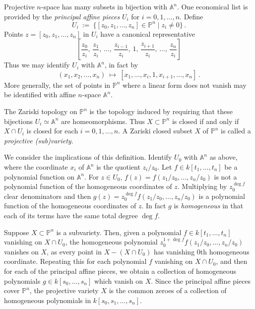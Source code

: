 \documentclass[12pt]{amsart}
\begin{document}
Projective $n$-space has many subsets in bijection with ${\mathbb A}^n$.
One economical list is provided by the {\sl principal affine pieces}
$U_i$ for $i=0,1,\ldots,n$.
Define
$$
  U_i\ :=\ \{[z_0,z_1,\ldots,z_n]\in{\mathbb P}^n\mid z_i\neq 0\}\,.
$$
Points $z=[z_0,z_1,\ldots,z_n]$ in $U_i$ have a canonical representative
$$
  \left[\frac{z_0}{z_i},\,\frac{z_1}{z_i},\,\ldots,\,
   \frac{z_{i-1}}{z_i},\,1,\,\frac{z_{i+1}}{z_i}
   ,\,\ldots,\,\frac{z_n}{z_i}\right]
$$
Thus we may identify $U_i$ with ${\mathbb A}^n$, in fact by
$$
  (x_1,x_2,\ldots,x_n)\ \longmapsto\ 
   [x_1,\ldots,x_i,1,x_{i+1},\ldots,x_n]\,.
$$
More generally, the set of points in ${\mathbb P}^n$ where a linear
form  does not vanish may be identified with affine $n$-space 
${\mathbb A}^n$.
\smallskip

The Zariski topology on ${\mathbb P}^n$ is the topology induced by requiring
that these bijections $U_i\simeq{\mathbb A}^n$ are homeomorphisms.
Thus $X\subset{\mathbb P}^n$ is closed if and only if $X\cap U_i$ is
closed for each $i=0,1,\ldots,n$.
A Zariski closed subset $X$ of ${\mathbb P}^n$ is called a 
{\sl projective (sub)variety}.
\smallskip

We consider the implications of this definition.
Identify $U_0$ with ${\mathbb A}^n$ as above, where the coordinate $x_i$ of
${\mathbb A}^n$ is the quotient $z_i/z_0$.
Let $f\in k[t_1,\ldots,t_n]$ be a polynomial function on ${\mathbb A}^n$.
For $z\in U_0$, $f(z)=f(z_1/z_0,\ldots,z_n/z_0)$ is not a polynomial
function of the homogeneous coordinates of $z$.
Multiplying by $z_0^{\deg f}$ clear denominators and 
then $g(z)=z_0^{\deg f}f(z_1/z_0,\ldots,z_n/z_0)$ is a polynomial
function of the homogeneous coordinates of $z$.
In fact $g$ is {\sl homogeneous} in that each of its terms have the same
total degree $\deg f$.

Suppose $X\subset {\mathbb P}^n$ is a subvariety.
Then, given a polynomial $f\in k[t_1,\ldots,t_n]$ vanishing on $X\cap U_0$,
the homogeneous polynomial $z_0^{1+\deg f}f(z_1/z_0,\ldots,z_n/z_0)$ 
vanishes on $X$, as every point in $X-(X\cap U_0)$ has vanishing 0th
homogeneous coordinate.
Repeating this for each polynomial $f$ vanishing on $X\cap U_0$, and then
for each of the principal affine pieces, we obtain a collection of
homogeneous polynomials $g\in k[s_0,\ldots,s_n]$ which vanish on $X$.
Since the principal affine pieces cover ${\mathbb P}^n$, the projective
variety $X$ is the common zeroes of a collection of homogeneous polynomials
in $k[s_0,s_1,\ldots,s_n]$.
\end{document}
